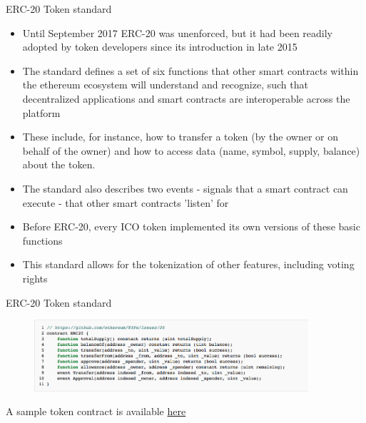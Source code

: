 \documentclass[9pt]{beamer}
\begin{document}
\begin{frame}{ERC-20 Token standard}
	\begin{small}
		\begin{itemize}
			\item Until September 2017 ERC-20 was unenforced, but it had been readily adopted by token developers since its introduction in late 2015
			\item The standard defines a set of six functions that other smart contracts within the ethereum ecosystem will understand and recognize, such that decentralized applications and smart contracts are interoperable across the platform
			\item These include, for instance, how to transfer a token (by the owner or on behalf of the owner) and how to access data (name, symbol, supply, balance) about the token.
			\item The standard also describes two events - signals that a smart contract can execute - that other smart contracts 'listen' for
			\item Before ERC-20, every ICO token implemented its own versions of these basic functions
			\item This standard allows for the tokenization of other features, including voting rights
		\end{itemize}
	\end{small}
\end{frame}




\begin{frame}{ERC-20 Token standard}
	\begin{figure}[]
		\centering
		\includegraphics  [width=4in]{Images/erc20}
	\end{figure}
	\begin{scriptsize}
		A sample token contract is available \href{https://theethereum.wiki/w/index.php/ERC20_Token_Standard}{here}
	\end{scriptsize}
\end{frame}

\end{document}
